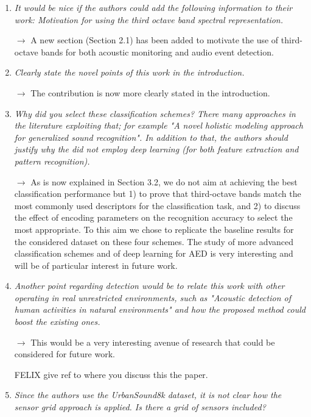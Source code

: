 \documentclass[10pt]{article}
\begin{document}
\begin{enumerate}

\item \emph{It would be nice if the authors could add the following information to their work: Motivation for using the third octave band spectral representation.}

$\rightarrow$ A new section (Section 2.1) has been added to motivate the use of third-octave bands for both acoustic monitoring and audio event detection.

\item \emph{Clearly state the novel points of this work in the introduction.}

$\rightarrow$ The contribution is now more clearly stated in the introduction.

\item \emph{Why did you select these classification schemes? There many approaches in the literature exploiting that; for example "A novel holistic modeling approach for generalized sound recognition". In addition to that, the authors should justify why the did not employ deep learning (for both feature extraction and pattern recognition).}

$\rightarrow$ As is now explained in Section 3.2, we do not aim at achieving the best classification performance but 1) to prove that third-octave bands match the most commonly used descriptors for the classification task, and 2) to discuss the effect of encoding parameters on the recognition accuracy to select the most appropriate. To this aim we chose to replicate the baseline results for the considered dataset on these four schemes.
The study of more advanced classification schemes and of deep learning for AED is very interesting and will be of particular interest in future work.

\item \emph{Another point regarding detection would be to relate this work with other operating in real unrestricted environments, such as "Acoustic detection of human activities in natural environments" and how the proposed method could boost the existing ones.}

$\rightarrow$ This would be a very interesting avenue of research that could be considered for future work.

FELIX give ref to where you discuss this the paper.

\item \emph{Since the authors use the UrbanSound8k dataset, it is not clear how the sensor grid approach is applied. Is there a grid of sensors included?}


\end{enumerate}
\end{document}
